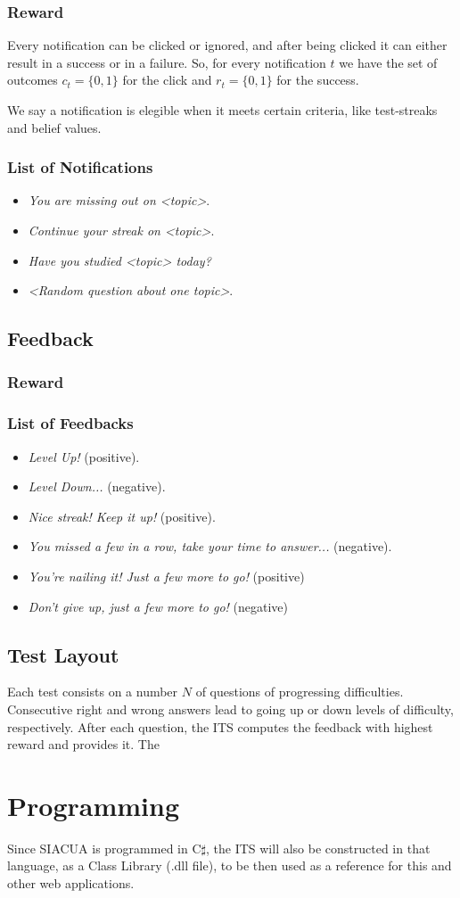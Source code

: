 \documentclass{article}
\newcommand{\0}{\mathbbold{0}}
\newcommand{\1}{\mathds{1}}
\begin{document}
\subsubsection{Reward}
Every notification can be clicked or ignored, and after being clicked it can either result in a success or in a failure.
So, for every notification $t$ we have the set of outcomes $c_t = \{0,1\}$ for the click and $r_t = \{0,1\}$ for the success.

We say a notification is elegible when it meets certain criteria, like test-streaks and belief values.
\subsubsection{List of Notifications}
\begin{itemize}
    \item \textsl{You are missing out on <topic>}.
    \item \textsl{Continue your streak on <topic>}.
    \item \textsl{Have you studied <topic> today?}
    \item \textsl{<Random question about one topic>}.
\end{itemize}
\subsection{Feedback}
\subsubsection{Reward}
\subsubsection{List of Feedbacks}
\begin{itemize}
    \item \textsl{Level Up!} (positive).
    \item \textsl{Level Down...} (negative).
    \item \textsl{Nice streak! Keep it up!} (positive).
    \item \textsl{You missed a few in a row, take your time to answer...} (negative).
    \item \textsl{You're nailing it! Just a few more to go!} (positive)
    \item \textsl{Don't give up, just a few more to go!} (negative)
\end{itemize}
\subsection{Test Layout}
Each test consists on a number $N$ of questions of progressing difficulties. Consecutive right and wrong answers lead to going up or down levels of difficulty, respectively.
After each question, the ITS computes the feedback with highest reward and provides it. The 

\section{Programming}
Since SIACUA is programmed in C$\sharp$, the ITS will also be constructed in that language, as a Class Library (.dll file), to be then used as a reference for this and other web applications.
\end{document}
